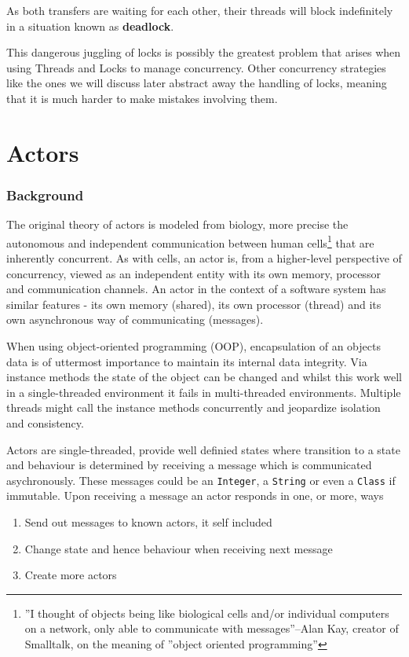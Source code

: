 \documentclass[a4paper,12pt]{kth-mag}
\begin{document}
As both transfers are waiting for each other, their threads will block indefinitely in a situation known as \textbf{deadlock}.

This dangerous juggling of locks is possibly the greatest problem that arises when using Threads and Locks to manage concurrency. Other concurrency strategies like the ones we will discuss later abstract away the handling of locks, meaning that it is much harder to make mistakes involving them.

\part{ Actors}

\section{Background}
The original theory of actors is modeled from biology, more precise the autonomous and independent communication between human cells\footnote{''I thought of objects being like biological cells and/or individual computers on a network, only able to communicate with messages''--Alan Kay, creator of Smalltalk, on the meaning of ''object oriented programming''} that are inherently concurrent. As with cells, an actor is, from a higher-level perspective of concurrency, viewed as an independent entity with its own memory, processor and communication channels. An actor in the context of a software system has similar features - its own memory (shared), its own processor (thread) and its own asynchronous way of communicating (messages).

When using object-oriented programming (OOP), encapsulation of an objects data is of uttermost importance to maintain its internal data integrity. Via instance methods the state of the object can be changed and whilst this work well in a single-threaded environment it fails in multi-threaded environments. Multiple threads might call the instance methods concurrently and jeopardize isolation and consistency. 

Actors are single-threaded, provide well definied states where transition to a state and behaviour is determined by receiving a message which is communicated asychronously. These messages could be an \texttt{Integer}, a \texttt{String} or even a \texttt{Class} if immutable. Upon receiving a message an actor responds in one, or more, ways \cite{HO09}

\begin{enumerate}
\item Send out messages to known actors, it self included
\item Change state and hence behaviour when receiving next message
\item Create more actors
\end{enumerate}
\end{document}
